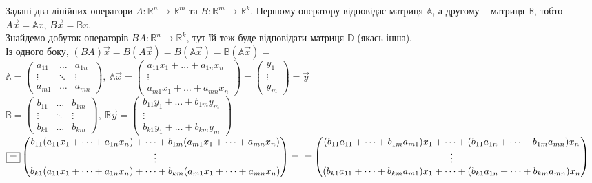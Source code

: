 \documentclass[a4paper, 10pt]{article}
\theoremstyle{theoremdd}
\begin{document}
	\noindent
	Задані два лінійних оператори $A \colon \mathbb{R}^n \to \mathbb{R}^m$ та $B \colon \mathbb{R}^m \to \mathbb{R}^k$. Першому оператору відповідає матриця $\mathbb{A}$, а другому -- матриця $\mathbb{B}$, тобто $A\vec{x}=\mathbb{A}x$, $B\vec{x}=\mathbb{B}x$.\\
	Знайдемо добуток операторів $BA \colon \mathbb{R}^n \to \mathbb{R}^k$, тут їй теж буде відповідати матриця $\mathbb{D}$ (якась інша).\\
	Із одного боку,
	$(BA)\vec{x} = B(A\vec{x}) = B(\mathbb{A}\vec{x}) = \mathbb{B}(\mathbb{A}\vec{x}) \boxed{=} $\\
	$
	\mathbb{A} = \begin{pmatrix}
	a_{11} & \dots & a_{1n}\\
	\vdots & \ddots & \vdots \\
	a_{m1} & \dots & a_{mn}
	\end{pmatrix},\
	\mathbb{A}\vec{x} = \begin{pmatrix}
	a_{11}x_1 + \dots + a_{1n}x_n \\
	\vdots \\
	a_{m1}x_1 + \dots + a_{mn}x_n
	\end{pmatrix} = \begin{pmatrix}
	y_1\\
	\vdots \\
	y_m
	\end{pmatrix} = \vec{y}$\\
	$\mathbb{B} = \begin{pmatrix}
	b_{11} & \dots & b_{1m}\\
	\vdots & \ddots & \vdots \\
	b_{k1} & \dots & b_{km}
	\end{pmatrix},\ \mathbb{B}\vec{y} = \begin{pmatrix}
	b_{11}y_1 + \dots + b_{1m}y_m \\
	\vdots \\
	b_{k1}y_1 + \dots + b_{km}y_m
	\end{pmatrix}$\\
	$
	\boxed{=} \begin{pmatrix}
	b_{11}(a_{11}x_1 + \dots + a_{1n}x_n) + \dots + b_{1m}(a_{m1}x_1 + \dots + a_{mn}x_n) \\
	\vdots \\
	b_{k1}(a_{11}x_1 + \dots + a_{1n}x_n) + \dots + b_{km}(a_{m1}x_1 + \dots + a_{mn}x_n)
	\end{pmatrix} = \\ = \begin{pmatrix}
	(b_{11}a_{11} + \dots + b_{1m}a_{m1})x_1 + \dots + (b_{11}a_{1n} + \dots + b_{1m}a_{mn})x_n \\
	\vdots \\
	(b_{k1}a_{11} + \dots + b_{km}a_{m1})x_1 + \dots + (b_{k1}a_{1n} + \dots + b_{km}a_{mn})x_n \\
	\end{pmatrix}$\\
\end{document}
